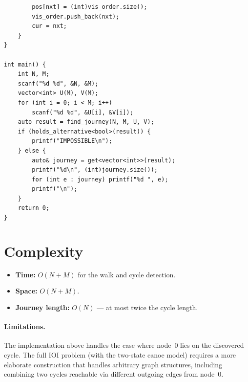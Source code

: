 \documentclass[11pt,a4paper]{article}
\begin{document}
\begin{lstlisting}
        pos[nxt] = (int)vis_order.size();
        vis_order.push_back(nxt);
        cur = nxt;
    }
}

int main() {
    int N, M;
    scanf("%d %d", &N, &M);
    vector<int> U(M), V(M);
    for (int i = 0; i < M; i++)
        scanf("%d %d", &U[i], &V[i]);
    auto result = find_journey(N, M, U, V);
    if (holds_alternative<bool>(result)) {
        printf("IMPOSSIBLE\n");
    } else {
        auto& journey = get<vector<int>>(result);
        printf("%d\n", (int)journey.size());
        for (int e : journey) printf("%d ", e);
        printf("\n");
    }
    return 0;
}
\end{lstlisting}

\section{Complexity}

\begin{itemize}
  \item \textbf{Time:} $O(N + M)$ for the walk and cycle detection.
  \item \textbf{Space:} $O(N + M)$.
  \item \textbf{Journey length:} $O(N)$ --- at most twice the cycle length.
\end{itemize}

\paragraph{Limitations.}  The implementation above handles the case
where node~0 lies on the discovered cycle.  The full IOI problem
(with the two-state canoe model) requires a more elaborate construction
that handles arbitrary graph structures, including combining two cycles
reachable via different outgoing edges from node~0.
\end{document}
